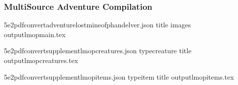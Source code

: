 \documentclass[letterpaper,10pt,english]{sphinxmanual}
\begin{document}
\subsubsection{Multi\sphinxhyphen{}Source Adventure Compilation}
\label{\detokenize{user-guide/examples:multi-source-adventure-compilation}}
\begin{sphinxVerbatim}[commandchars=\\\{\}]
5e2pdfconvertadventurelost\PYGZhy{}mine\PYGZhy{}of\PYGZhy{}phandelver.json
\PYGZhy{}\PYGZhy{}title
\PYGZhy{}\PYGZhy{}images
\PYGZhy{}\PYGZhy{}outputlmop\PYGZhy{}main.tex

5e2pdfconvertsupplementlmop\PYGZhy{}creatures.json
\PYGZhy{}\PYGZhy{}typecreature
\PYGZhy{}\PYGZhy{}title
\PYGZhy{}\PYGZhy{}outputlmop\PYGZhy{}creatures.tex

5e2pdfconvertsupplementlmop\PYGZhy{}items.json
\PYGZhy{}\PYGZhy{}typeitem
\PYGZhy{}\PYGZhy{}title
\PYGZhy{}\PYGZhy{}outputlmop\PYGZhy{}items.tex

\end{sphinxVerbatim}
\end{document}
